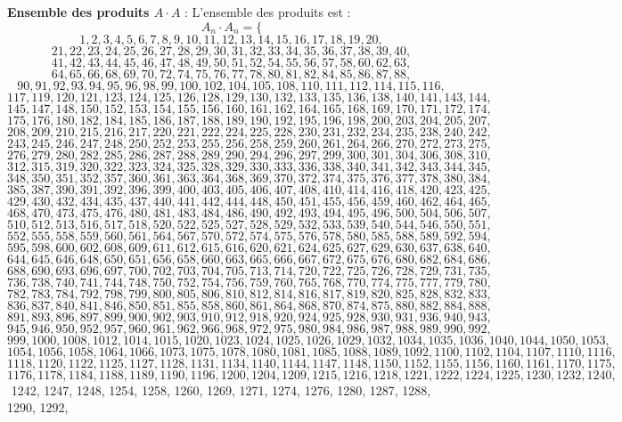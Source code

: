 \documentclass[11pt,a4paper]{article}
\begin{document}
\textbf{Ensemble des produits $A \cdot A$} :
L'ensemble des produits est :
$$ A_{{{n}}} \cdot A_{{{n}}} = \{ $$$$ 1, 2, 3, 4, 5, 6, 7, 8, 9, 10, 11, 12, 13, 14, 15, 16, 17, 18, 19, 20, $$$$ 21, 22, 23, 24, 25, 26, 27, 28, 29, 30, 31, 32, 33, 34, 35, 36, 37, 38, 39, 40, $$$$ 41, 42, 43, 44, 45, 46, 47, 48, 49, 50, 51, 52, 54, 55, 56, 57, 58, 60, 62, 63, $$$$ 64, 65, 66, 68, 69, 70, 72, 74, 75, 76, 77, 78, 80, 81, 82, 84, 85, 86, 87, 88, $$$$ 90, 91, 92, 93, 94, 95, 96, 98, 99, 100, 102, 104, 105, 108, 110, 111, 112, 114, 115, 116, $$$$ 117, 119, 120, 121, 123, 124, 125, 126, 128, 129, 130, 132, 133, 135, 136, 138, 140, 141, 143, 144, $$$$ 145, 147, 148, 150, 152, 153, 154, 155, 156, 160, 161, 162, 164, 165, 168, 169, 170, 171, 172, 174, $$$$ 175, 176, 180, 182, 184, 185, 186, 187, 188, 189, 190, 192, 195, 196, 198, 200, 203, 204, 205, 207, $$$$ 208, 209, 210, 215, 216, 217, 220, 221, 222, 224, 225, 228, 230, 231, 232, 234, 235, 238, 240, 242, $$$$ 243, 245, 246, 247, 248, 250, 252, 253, 255, 256, 258, 259, 260, 261, 264, 266, 270, 272, 273, 275, $$$$ 276, 279, 280, 282, 285, 286, 287, 288, 289, 290, 294, 296, 297, 299, 300, 301, 304, 306, 308, 310, $$$$ 312, 315, 319, 320, 322, 323, 324, 325, 328, 329, 330, 333, 336, 338, 340, 341, 342, 343, 344, 345, $$$$ 348, 350, 351, 352, 357, 360, 361, 363, 364, 368, 369, 370, 372, 374, 375, 376, 377, 378, 380, 384, $$$$ 385, 387, 390, 391, 392, 396, 399, 400, 403, 405, 406, 407, 408, 410, 414, 416, 418, 420, 423, 425, $$$$ 429, 430, 432, 434, 435, 437, 440, 441, 442, 444, 448, 450, 451, 455, 456, 459, 460, 462, 464, 465, $$$$ 468, 470, 473, 475, 476, 480, 481, 483, 484, 486, 490, 492, 493, 494, 495, 496, 500, 504, 506, 507, $$$$ 510, 512, 513, 516, 517, 518, 520, 522, 525, 527, 528, 529, 532, 533, 539, 540, 544, 546, 550, 551, $$$$ 552, 555, 558, 559, 560, 561, 564, 567, 570, 572, 574, 575, 576, 578, 580, 585, 588, 589, 592, 594, $$$$ 595, 598, 600, 602, 608, 609, 611, 612, 615, 616, 620, 621, 624, 625, 627, 629, 630, 637, 638, 640, $$$$ 644, 645, 646, 648, 650, 651, 656, 658, 660, 663, 665, 666, 667, 672, 675, 676, 680, 682, 684, 686, $$$$ 688, 690, 693, 696, 697, 700, 702, 703, 704, 705, 713, 714, 720, 722, 725, 726, 728, 729, 731, 735, $$$$ 736, 738, 740, 741, 744, 748, 750, 752, 754, 756, 759, 760, 765, 768, 770, 774, 775, 777, 779, 780, $$$$ 782, 783, 784, 792, 798, 799, 800, 805, 806, 810, 812, 814, 816, 817, 819, 820, 825, 828, 832, 833, $$$$ 836, 837, 840, 841, 846, 850, 851, 855, 858, 860, 861, 864, 868, 870, 874, 875, 880, 882, 884, 888, $$$$ 891, 893, 896, 897, 899, 900, 902, 903, 910, 912, 918, 920, 924, 925, 928, 930, 931, 936, 940, 943, $$$$ 945, 946, 950, 952, 957, 960, 961, 962, 966, 968, 972, 975, 980, 984, 986, 987, 988, 989, 990, 992, $$$$ 999, 1000, 1008, 1012, 1014, 1015, 1020, 1023, 1024, 1025, 1026, 1029, 1032, 1034, 1035, 1036, 1040, 1044, 1050, 1053, $$$$ 1054, 1056, 1058, 1064, 1066, 1073, 1075, 1078, 1080, 1081, 1085, 1088, 1089, 1092, 1100, 1102, 1104, 1107, 1110, 1116, $$$$ 1118, 1120, 1122, 1125, 1127, 1128, 1131, 1134, 1140, 1144, 1147, 1148, 1150, 1152, 1155, 1156, 1160, 1161, 1170, 1175, $$$$ 1176, 1178, 1184, 1188, 1189, 1190, 1196, 1200, 1204, 1209, 1215, 1216, 1218, 1221, 1222, 1224, 1225, 1230, 1232, 1240, $$$$ 1242, 1247, 1248, 1254, 1258, 1260, 1269, 1271, 1274, 1276, 1280, 1287, 1288, 1290, 1292, 
\end{document}
